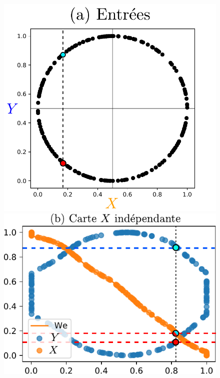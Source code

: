 \documentclass[../main]{subfiles}
\begin{document}
\begin{figure}
\begin{minipage}{0.27\textwidth}
\includegraphics[width=\textwidth]{2som_inp_noU.pdf}
\end{minipage}
\begin{minipage}{0.34\textwidth}
\includegraphics[width=\textwidth]{weights_2som_unco.pdf}
\end{minipage}
\begin{minipage}{0.38\textwidth}

\end{minipage}
\end{figure}
\end{document}
